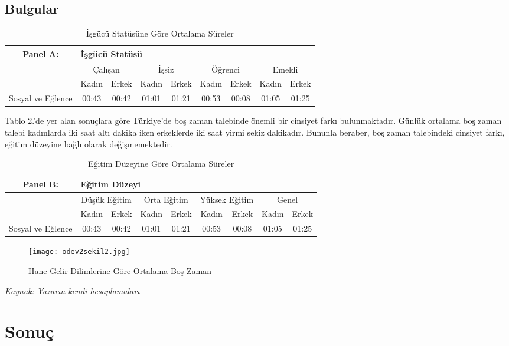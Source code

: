 \documentclass[11pt]{article}
\begin{document}
\subsection{Bulgular}

\begin{table}[h!]
	\begin{center}
		\caption{İşgücü Statüsüne Göre Ortalama Süreler}
		\label{tablo1}
		\begin{tabular}{c c c c c c c c c }
			Panel A: & \multicolumn{8}{l}{İşgücü Statüsü} \\
			 \hline & \multicolumn{2}{c}{Çalışan} & \multicolumn{2}{c}{İşsiz} & \multicolumn{2}{c}{Öğrenci} & \multicolumn{2}{c}{Emekli} \\
			  & Kadın & Erkek & Kadın & Erkek & Kadın & Erkek & Kadın & Erkek \\
			  \hline Sosyal ve Eğlence & 00:43 & 00:42 & 01:01 & 01:21 & 00:53 & \cellcolor{yellow}00:08 & 01:05 &01:25 \\
			  \hline
		\end{tabular}
	\end{center}
\end{table}

Tablo 2.’de yer alan sonuçlara göre Türkiye’de boş zaman talebinde önemli bir cinsiyet farkı bulunmaktadır.  Günlük ortalama boş zaman talebi kadınlarda iki saat altı dakika iken erkeklerde iki saat yirmi sekiz dakikadır. Bununla beraber, boş zaman talebindeki cinsiyet farkı, eğitim düzeyine bağlı olarak değişmemektedir.

\begin{table}[h!]
	\begin{center}
		\caption{Eğitim Düzeyine Göre Ortalama Süreler}
		\label{tablo2}
		\begin{tabular}{c c c c c c c c c }
			Panel B: & \multicolumn{8}{l}{Eğitim Düzeyi} \\
			\hline & \multicolumn{2}{c}{Düşük Eğitim} & \multicolumn{2}{c}{Orta Eğitim} & \multicolumn{2}{c}{Yüksek Eğitim} & \multicolumn{2}{c}{Genel} \\
			& Kadın & Erkek & Kadın & Erkek & Kadın & Erkek & Kadın & Erkek \\
			\hline Sosyal ve Eğlence & 00:43 & 00:42 & 01:01 & 01:21 & 00:53 & \cellcolor{yellow}00:08 & 01:05 &01:25 \\
			\hline
		\end{tabular}
	\end{center}
\end{table}

	\begin{figure}[h!]
	\caption{Hane Gelir Dilimlerine Göre Ortalama Boş Zaman}
	\texttt{[image: odev2sekil2.jpg]}
	\label{sekil2}
\end{figure}

\footnotesize\textit{ Kaynak: Yazarın kendi hesaplamaları}

\section{Sonuç}
\end{document}
